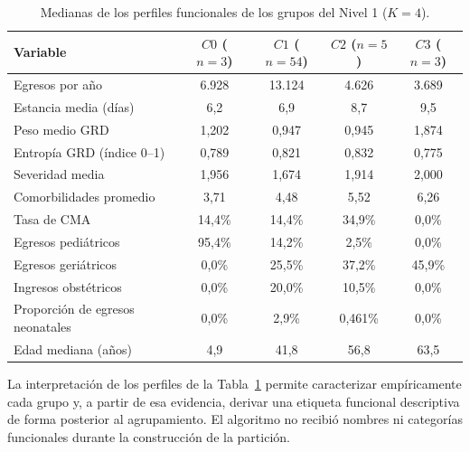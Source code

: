 \begin{table}[htbp]
\centering
\caption{Medianas de los perfiles funcionales de los grupos del Nivel 1
($K=4$).}
\label{tab:perfiles-nivel1}
\begin{tabular}{l c c c c}
\toprule
\textbf{Variable} & \textbf{$C0$ ($n=3$)} & \textbf{$C1$ ($n=54$)} &
\textbf{$C2$ ($n=5$)} & \textbf{$C3$ ($n=3$)} \\
\midrule
Egresos por año & 6.928 & 13.124 & 4.626 & 3.689 \\
Estancia media (días) & 6{,}2 & 6{,}9 & 8{,}7 & 9{,}5 \\
Peso medio GRD & 1{,}202 & 0{,}947 & 0{,}945 & 1{,}874 \\
Entropía GRD (índice 0--1) & 0{,}789 & 0{,}821 & 0{,}832 & 0{,}775 \\
Severidad media & 1{,}956 & 1{,}674 & 1{,}914 & 2{,}000 \\
Comorbilidades promedio & 3{,}71 & 4{,}48 & 5{,}52 & 6{,}26 \\
Tasa de CMA & 14{,}4\% & 14{,}4\% & 34{,}9\% & 0{,}0\% \\
Egresos pediátricos & 95{,}4\% & 14{,}2\% & 2{,}5\% & 0{,}0\% \\
Egresos geriátricos & 0{,}0\% & 25{,}5\% & 37{,}2\% & 45{,}9\% \\
Ingresos obstétricos & 0{,}0\% & 20{,}0\% & 10{,}5\% & 0{,}0\% \\
Proporción de egresos neonatales & 0{,}0\% & 2{,}9\% & 0{,}461\% & 0{,}0\% \\
Edad mediana (años) & 4{,}9 & 41{,}8 & 56{,}8 & 63{,}5 \\
\bottomrule
\end{tabular}
\end{table}

La interpretación de los perfiles de la Tabla~\ref{tab:perfiles-nivel1} permite
caracterizar empíricamente cada grupo y, a partir de esa evidencia, derivar una
etiqueta funcional descriptiva de forma posterior al agrupamiento. El algoritmo
no recibió nombres ni categorías funcionales durante la construcción de la
partición.

